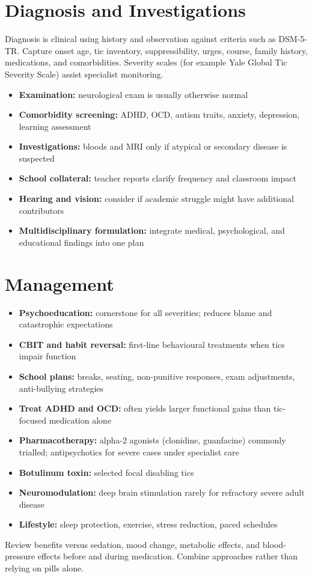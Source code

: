 \section*{Diagnosis and Investigations}
Diagnosis is clinical using history and observation against criteria such as DSM-5-TR. Capture onset age, tic inventory, suppressibility, urges, course, family history, medications, and comorbidities. Severity scales (for example Yale Global Tic Severity Scale) assist specialist monitoring.

\begin{itemize}
    \item \textbf{Examination:} neurological exam is usually otherwise normal
    \item \textbf{Comorbidity screening:} ADHD, OCD, autism traits, anxiety, depression, learning assessment
    \item \textbf{Investigations:} bloods and MRI only if atypical or secondary disease is suspected
    \item \textbf{School collateral:} teacher reports clarify frequency and classroom impact
    \item \textbf{Hearing and vision:} consider if academic struggle might have additional contributors
    \item \textbf{Multidisciplinary formulation:} integrate medical, psychological, and educational findings into one plan
\end{itemize}

\section*{Management}
\begin{itemize}
    \item \textbf{Psychoeducation:} cornerstone for all severities; reduces blame and catastrophic expectations
    \item \textbf{CBIT and habit reversal:} first-line behavioural treatments when tics impair function
    \item \textbf{School plans:} breaks, seating, non-punitive responses, exam adjustments, anti-bullying strategies
    \item \textbf{Treat ADHD and OCD:} often yields larger functional gains than tic-focused medication alone
    \item \textbf{Pharmacotherapy:} alpha-2 agonists (clonidine, guanfacine) commonly trialled; antipsychotics for severe cases under specialist care
    \item \textbf{Botulinum toxin:} selected focal disabling tics
    \item \textbf{Neuromodulation:} deep brain stimulation rarely for refractory severe adult disease
    \item \textbf{Lifestyle:} sleep protection, exercise, stress reduction, paced schedules
\end{itemize}
Review benefits versus sedation, mood change, metabolic effects, and blood-pressure effects before and during medication. Combine approaches rather than relying on pills alone.


